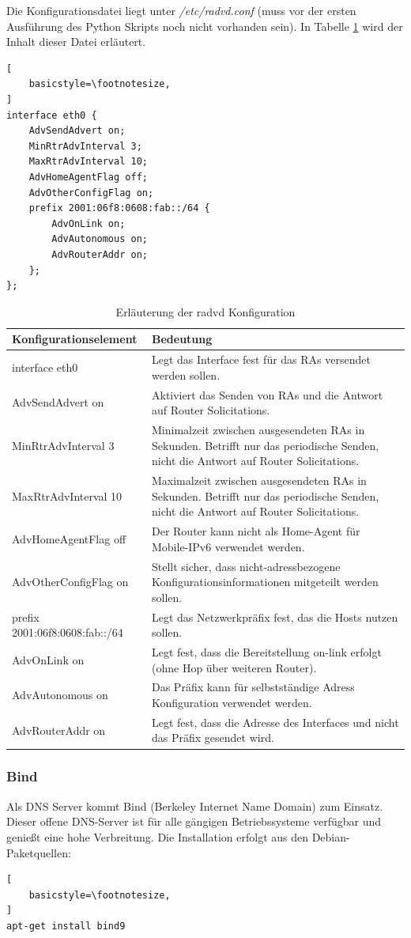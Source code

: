 Die Konfigurationsdatei liegt unter \textit{/etc/radvd.conf} (muss vor der ersten Ausführung des Python Skripts noch nicht vorhanden sein). In Tabelle \ref{tab:radvdConfig} wird der Inhalt dieser Datei erläutert.
\begin{lstlisting}[
	basicstyle=\footnotesize,
]
interface eth0 {
	AdvSendAdvert on;
	MinRtrAdvInterval 3;
	MaxRtrAdvInterval 10;
	AdvHomeAgentFlag off;
	AdvOtherConfigFlag on;
	prefix 2001:06f8:0608:fab::/64 {
		AdvOnLink on;
		AdvAutonomous on;
		AdvRouterAddr on;
	};
};
\end{lstlisting}

\begin{table}
	\centering
		\begin{tabular}{lp{9cm}}
			Konfigurationselement & Bedeutung \\ \hline
			interface eth0 & Legt das Interface fest für das RAs versendet werden sollen. \\
			AdvSendAdvert on & Aktiviert das Senden von RAs und die Antwort auf Router Solicitations. \\
			MinRtrAdvInterval 3 & Minimalzeit zwischen ausgesendeten RAs in Sekunden. Betrifft nur das periodische Senden, nicht die Antwort auf Router Solicitations. \\
			MaxRtrAdvInterval 10 & Maximalzeit zwischen ausgesendeten RAs in Sekunden. Betrifft nur das periodische Senden, nicht die Antwort auf Router Solicitations. \\
			AdvHomeAgentFlag off & Der Router kann nicht als Home-Agent für Mobile-IPv6 verwendet werden. \\
			AdvOtherConfigFlag on & Stellt sicher, dass nicht-adressbezogene Konfigurationsinformationen mitgeteilt werden sollen. \\
			prefix 2001:06f8:0608:fab::/64 & Legt das Netzwerkpräfix fest, das die Hosts nutzen sollen. \\
			AdvOnLink on & Legt fest, dass die Bereitstellung on-link erfolgt (ohne Hop über weiteren Router). \\
			AdvAutonomous on & Das Präfix kann für selbstständige Adress Konfiguration verwendet werden. \\
			AdvRouterAddr on & Legt fest, dass die Adresse des Interfaces und nicht das Präfix gesendet wird.  \\
		\end{tabular}
	\caption{Erläuterung der radvd Konfiguration}
	\label{tab:radvdConfig}
\end{table}
\FloatBarrier
\subsubsection*{Bind}
Als DNS Server kommt Bind (Berkeley Internet Name Domain) zum Einsatz. Dieser offene DNS-Server ist für alle gängigen Betriebssysteme verfügbar und genießt eine hohe Verbreitung. Die Installation erfolgt aus den Debian-Paketquellen:
\lstset{language=bash}
\begin{lstlisting}[
	basicstyle=\footnotesize,
]
apt-get install bind9
\end{lstlisting}

